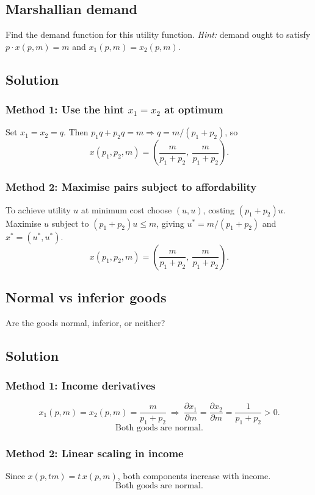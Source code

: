 \documentclass[12pt]{article}
\newcommand{\dotp}{\cdot}
\begin{document}
\newpage
\subsection{Marshallian demand}
Find the demand function for this utility function. \emph{Hint:} demand ought to satisfy
\(p\dotp x(p,m)=m\) and \(x_1(p,m)=x_2(p,m)\).

\subsection*{Solution}
\subsubsection*{Method 1: Use the hint \(x_1=x_2\) at optimum}
Set \(x_1=x_2=q\). Then \(p_1q+p_2q=m\Rightarrow q=m/(p_1+p_2)\), so
\[
\boxed{x(p_1,p_2,m)=\left(\dfrac{m}{p_1+p_2},\ \dfrac{m}{p_1+p_2}\right).}
\]

\subsubsection*{Method 2: Maximise pairs subject to affordability}
To achieve utility \(u\) at minimum cost choose \((u,u)\), costing \((p_1+p_2)u\). Maximise \(u\) subject to \((p_1+p_2)u\le m\), giving \(u^*=m/(p_1+p_2)\) and \(x^*=(u^*,u^*)\).
\[
\boxed{x(p_1,p_2,m)=\left(\dfrac{m}{p_1+p_2},\ \dfrac{m}{p_1+p_2}\right).}
\]

\subsection{Normal vs inferior goods}
Are the goods normal, inferior, or neither?

\subsection*{Solution}
\subsubsection*{Method 1: Income derivatives}
\[
x_1(p,m)=x_2(p,m)=\frac{m}{p_1+p_2}
\ \Rightarrow\
\frac{\partial x_1}{\partial m}=\frac{\partial x_2}{\partial m}=\frac{1}{p_1+p_2}>0.
\]
\[
\boxed{\text{Both goods are normal.}}
\]

\subsubsection*{Method 2: Linear scaling in income}
Since \(x(p,tm)=t\,x(p,m)\), both components increase with income.
\[
\boxed{\text{Both goods are normal.}}
\]
\end{document}
